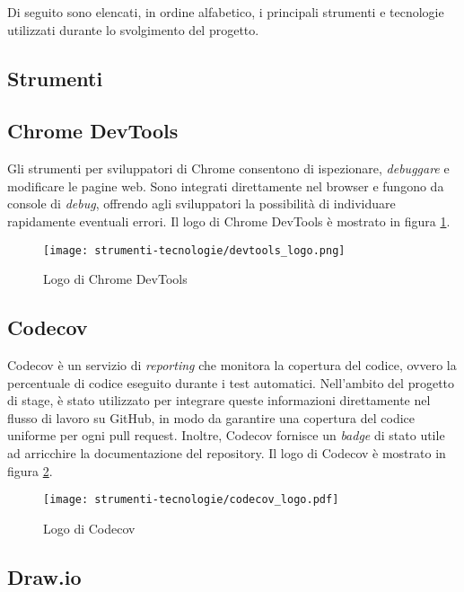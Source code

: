 \par Di seguito sono elencati, in ordine alfabetico, i principali strumenti e tecnologie utilizzati durante lo svolgimento del progetto.

\subsection{Strumenti}

\subsection*{Chrome DevTools}

\par Gli strumenti per sviluppatori di Chrome consentono di ispezionare, \textit{debuggare} e modificare le pagine web. Sono integrati direttamente nel browser e fungono da console di \textit{debug}, offrendo agli sviluppatori la possibilità di individuare rapidamente eventuali errori. Il logo di Chrome DevTools è mostrato in figura \ref{fig:logo_chrome_devtools}.

\begin{figure}[H]
  \centering 
  \texttt{[image: strumenti-tecnologie/devtools\_logo.png]} 
  \caption{Logo di Chrome DevTools}
  \label{fig:logo_chrome_devtools}
\end{figure}

\subsection*{Codecov}

\par Codecov è un servizio di \textit{reporting} che monitora la copertura del codice, ovvero la percentuale di codice eseguito durante i test automatici. Nell’ambito del progetto di stage, è stato utilizzato per integrare queste informazioni direttamente nel flusso di lavoro su GitHub, in modo da garantire una copertura del codice uniforme per ogni \gls{pull request}. Inoltre, Codecov fornisce un \textit{badge} di stato utile ad arricchire la documentazione del \gls{repository}. Il logo di Codecov è mostrato in figura \ref{fig:logo_codecov}.

\begin{figure}[H]
  \centering 
  \texttt{[image: strumenti-tecnologie/codecov\_logo.pdf]} 
  \caption{Logo di Codecov}
  \label{fig:logo_codecov}
\end{figure}

\subsection*{Draw.io}

